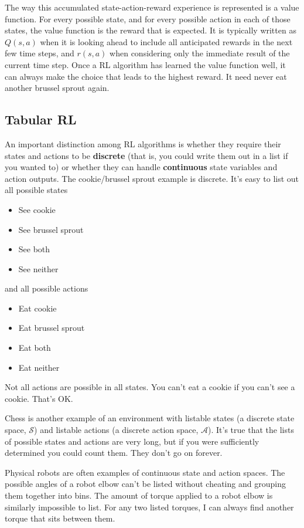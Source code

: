 The way this accumulated state-action-reward experience is represented
is a value function. For every possible state, and for every possible action
in each of those states, the value function is the reward that is expected.
It is typically written as $Q(s, a)$ when it is looking ahead to include
all anticipated rewards in the next few time steps, and $r(s, a)$ when considering
only the immediate result of the current time step. Once a RL algorithm has learned the
value function well, it can always make the choice that leads
to the highest reward. It need never eat another brussel sprout again.


\subsection{Tabular RL}
\label{subsec:introtabular}

An important distinction among RL algorithms is whether they require their
states and actions to be \textbf{discrete} (that is, you could write
them out in a list if you wanted to) or whether they can handle
\textbf{continuous} state variables and action outputs.
The cookie/brussel sprout example is discrete.
It's easy to list out all possible states
\begin{itemize}
  \item{See cookie}
  \item{See brussel sprout}
  \item{See both}
  \item{See neither}
\end{itemize}
and all possible actions
\begin{itemize}
  \item{Eat cookie}
  \item{Eat brussel sprout}
  \item{Eat both}
  \item{Eat neither}
\end{itemize}
Not all actions are possible in all states. You can't eat a cookie
if you can't see a cookie. That's OK.

Chess is another example of an environment with listable states
(a discrete state space, $\mathcal{S}$) and listable actions
(a discrete action space, $\mathcal{A}$). It's true that the lists
of possible states and actions are very long, but if you were sufficiently
determined you could count them. They don't go on forever.

Physical robots are often examples of continuous state and action spaces.
The possible angles of a robot elbow can't be listed without cheating and
grouping them together into bins. The amount of torque applied to a robot
elbow is similarly impossible to list. For any two listed torques,
I can always find another torque that sits between them.

